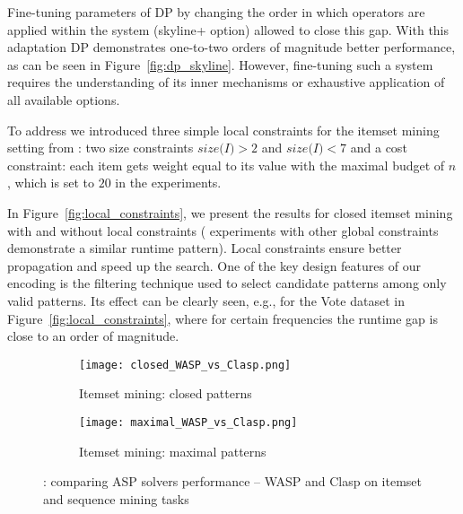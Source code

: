 Fine-tuning parameters of DP by changing the order in which operators are applied within the system (skyline+ option) allowed to close this gap. With this adaptation DP demonstrates one-to-two orders of magnitude better performance, as can be seen in Figure~\ref{fig:dp_skyline}. However, fine-tuning such a system requires the understanding of its inner mechanisms or exhaustive application of all available options. 

To %
address \qthree we introduced three simple local constraints %
for the itemset mining setting from \qtwo: %
two size constraints $\textit{size(I)} > 2$ and $\textit{size(I)} < 7$ and a cost constraint: each item gets weight equal to its value with the maximal budget of $n$, which is set to $20$ in the experiments. %

In Figure~\ref{fig:local_constraints}, we present the results for closed itemset mining with and without local constraints (%
experiments with other global constraints demonstrate a similar runtime pattern). %
Local constraints ensure %
better propagation and speed up the search. One of the key design features of our encoding is the filtering technique used to select candidate patterns among only valid patterns. Its effect can be clearly seen, e.g., for the Vote dataset in Figure~\ref{fig:local_constraints}, where for certain frequencies the runtime gap is close to an order of magnitude.

\begin{figure}[tb]
  \centering
  \begin{subfigure}[t]{\textwidth}
  \centering
   \texttt{[image: closed\_WASP\_vs\_Clasp.png]}
   \caption{Itemset mining: closed patterns}
    \label{fig:itemset_wasp_closed_comparison}
  \end{subfigure}
  \begin{subfigure}[t]{\textwidth}
  \centering
   \texttt{[image: maximal\_WASP\_vs\_Clasp.png]}
   \caption{Itemset mining: maximal patterns} 
   \label{fig:itemset_wasp_max_comparison}
  \end{subfigure}
\caption{\qfour: comparing ASP solvers performance -- WASP and Clasp on itemset and sequence mining tasks}
\end{figure}

